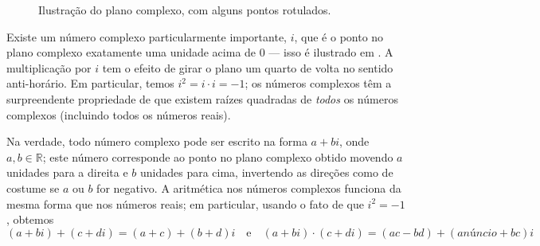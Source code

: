 \begin{figure}[p!]
\centering
{}
\caption{Ilustração do plano complexo, com alguns pontos rotulados.}
\label{figComplexNumbers}
\end{figure}

Existe um número complexo particularmente importante, $i$, que é o ponto no plano complexo exatamente uma unidade acima de $0$ --- isso é ilustrado em . A multiplicação por $i$ tem o efeito de girar o plano um quarto de volta no sentido anti-horário. Em particular, temos $i^2 = i \cdot i = -1$; os números complexos têm a surpreendente propriedade de que existem raízes quadradas de \textit{todos} os números complexos (incluindo todos os números reais).

Na verdade, todo número complexo pode ser escrito na forma $a+bi$, onde $a,b \in \mathbb{R}$; este número corresponde ao ponto no plano complexo obtido movendo $a$ unidades para a direita e $b$ unidades para cima, invertendo as direções como de costume se $a$ ou $b$ for negativo. A aritmética nos números complexos funciona da mesma forma que nos números reais; em particular, usando o fato de que $i^2=-1$, obtemos
\[ (a+bi)+(c+di) = (a+c)+(b+d)i \quad \text{e} \quad (a+bi) \cdot (c+di) = (ac -bd) + (anúncio+bc)i \]

